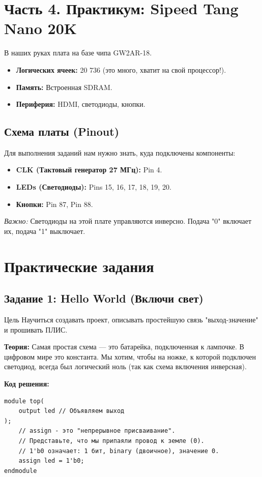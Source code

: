 \documentclass[12pt, a4paper]{article}
\begin{document}
\newpage

\section{Часть 4. Практикум: Sipeed Tang Nano 20K}

В наших руках плата на базе чипа GW2AR-18.
\begin{itemize}
    \item \textbf{Логических ячеек:} 20 736 (это много, хватит на свой процессор!).
    \item \textbf{Память:} Встроенная SDRAM.
    \item \textbf{Периферия:} HDMI, светодиоды, кнопки.
\end{itemize}

\subsection{Схема платы (Pinout)}
Для выполнения заданий нам нужно знать, куда подключены компоненты:
\begin{itemize}
    \item \textbf{CLK (Тактовый генератор 27 МГц):} Pin 4.
    \item \textbf{LEDs (Светодиоды):} Pins 15, 16, 17, 18, 19, 20.
    \item \textbf{Кнопки:} Pin 87, Pin 88.
\end{itemize}
\textit{Важно:} Светодиоды на этой плате управляются инверсно. Подача "0" включает их, подача "1" выключает.

\newpage
\section{Практические задания}

\subsection{Задание 1: Hello World (Включи свет)}
\begin{taskbox}{Цель}
Научиться создавать проект, описывать простейшую связь "выход-значение" и прошивать ПЛИС.
\end{taskbox}

\textbf{Теория:}
Самая простая схема — это батарейка, подключенная к лампочке. В цифровом мире это константа. Мы хотим, чтобы на ножке, к которой подключен светодиод, всегда был логический ноль (так как схема включения инверсная).

\textbf{Код решения:}
\begin{lstlisting}
module top(
    output led // Объявляем выход
);
    // assign - это "непрерывное присваивание".
    // Представьте, что мы припаяли провод к земле (0).
    // 1'b0 означает: 1 бит, binary (двоичное), значение 0.
    assign led = 1'b0; 
endmodule
\end{lstlisting}
\end{document}
